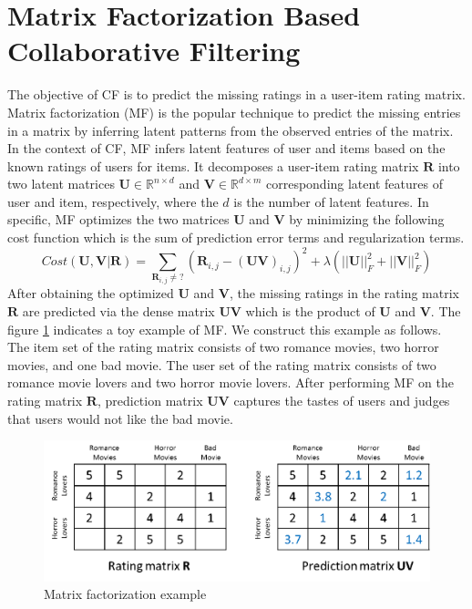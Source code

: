 \documentclass[master,english,final]{kaist-ucs}
\begin{document}
\section{Matrix Factorization Based Collaborative Filtering}
The objective of CF is to predict the missing ratings in a user-item rating matrix.
Matrix factorization (MF) is the popular technique to predict the missing entries in a matrix by inferring latent patterns from the observed entries of the matrix.
In the context of CF, MF infers latent features of user and items based on the known ratings of users for items.
It decomposes a user-item rating matrix $\bm{R}$ into two latent matrices $\bm{U} \in \mathbb{R}^{n \times d}$ and $\bm{V} \in \mathbb{R}^{d \times m}$ corresponding latent features of user and item, respectively, where the $d$ is the number of latent features.
In specific, MF optimizes the two matrices $\bm{U}$ and $\bm{V}$ by minimizing the following cost function which is the sum of prediction error terms and regularization terms.
\begin{equation}
Cost(\bm{U},\bm{V} | \bm{R})=\sum_{\bm{R}_{i,j} \neq ?} (  \bm{R}_{i,j} - (\bm{UV})_{i,j} )^2 + \lambda(||\bm{U}||_F^2+||\bm{V}||_F^2)
\end{equation}
After obtaining the optimized $\bm{U}$ and $\bm{V}$, the missing ratings in the rating matrix $\bm{R}$ are predicted via the dense matrix $\bm{UV}$ which is the product of $\bm{U}$ and $\bm{V}$.
The figure \ref{mf_base} indicates a toy example of MF.
We construct this example as follows.
The item set of the rating matrix consists of two romance movies, two horror movies, and one bad movie.
The user set of the rating matrix consists of two romance movie lovers and two horror movie lovers.
After performing MF on the rating matrix $\bm{R}$, prediction matrix $\bm{UV}$ captures the tastes of users and judges that users would not like the bad movie.

\begin{figure}[t]
    \centerline{\includegraphics[width=12.5cm]{figure/mf_base}}
    \caption{Matrix factorization example} \label{mf_base}
\end{figure}
\end{document}
